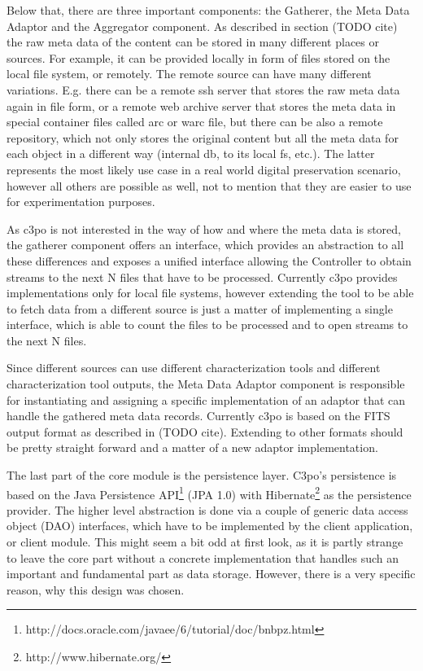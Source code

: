 Below that, there are three important components: the Gatherer, the Meta Data Adaptor and the Aggregator component.
As described in section (TODO cite) the raw meta data of the content can be stored in many different places or sources. For example, it can be provided locally in form of files stored on the local file system, or remotely. The remote source can have many different variations. E.g. there can be a remote ssh server that stores the raw meta data again in file form, or a remote web archive server that stores the meta data in special container files called arc or warc file, but there can be also a remote repository, which not only stores the original content but all the meta data for each object in a different way (internal db, to its local fs, etc.). The latter represents the most likely use case in a real world digital preservation scenario, however all others are possible as well, not to mention that they are easier to use for experimentation purposes.

As c3po is not interested in the way of how and where the meta data is stored, the gatherer component offers an interface, which provides an abstraction to all these differences and exposes a unified interface allowing the Controller to obtain streams to the next N files that have to be processed. Currently c3po provides implementations only for local file systems, however extending the tool to be able to fetch data from a different source is just a matter of implementing a single interface, which is able to count the files to be processed and to open streams to the next N files. 

Since different sources can use different characterization tools and different characterization tool outputs, the Meta Data Adaptor component is responsible for instantiating and assigning a specific implementation of an adaptor that can handle the gathered meta data records. Currently c3po is based on the FITS output format as described in (TODO cite). Extending to other formats should be pretty straight forward and a matter of a new adaptor implementation.


The last part of the core module is the persistence layer. C3po's persistence is based on the Java Persistence API\footnote{http://docs.oracle.com/javaee/6/tutorial/doc/bnbpz.html} (JPA 1.0) with Hibernate\footnote{http://www.hibernate.org/} as the persistence provider. The higher level abstraction is done via a couple of generic data access object (DAO) interfaces, which have to be implemented by the client application, or client module.
This might seem a bit odd at first look, as it is partly strange to leave the core part without a concrete implementation that handles such an important and fundamental part as data storage. However, there is a very specific reason, why this design was chosen.

